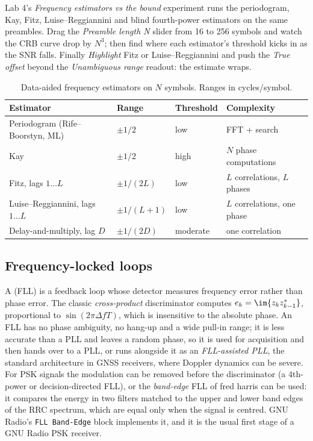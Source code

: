 \begin{tryit}
Lab 4's \emph{Frequency estimators vs the bound} experiment runs the periodogram, Kay, Fitz,
Luise--Reggiannini and blind fourth-power estimators on the same preambles. Drag the \emph{Preamble
length N} slider from 16 to 256 symbols and watch the CRB curve drop by $N^3$; then find where each
estimator's threshold kicks in as the SNR falls. Finally \emph{Highlight} Fitz or Luise--Reggiannini
and push the \emph{True offset} beyond the \emph{Unambiguous range} readout: the estimate wraps.
\end{tryit}

\begin{table}[!htb]\centering\small
\caption{Data-aided frequency estimators on $N$ symbols. Ranges in cycles/symbol.}
\label{tab:ch10:freqest}
\begin{tabular}{llll}
\toprule
Estimator & Range & Threshold & Complexity \\
\midrule
Periodogram (Rife--Boorstyn, ML) & $\pm1/2$ & low & FFT + search \\
Kay & $\pm1/2$ & high & $N$ phase computations \\
Fitz, lags $1\dots L$ & $\pm1/(2L)$ & low & $L$ correlations, $L$ phases \\
Luise--Reggiannini, lags $1\dots L$ & $\pm1/(L+1)$ & low & $L$ correlations, one phase \\
Delay-and-multiply, lag $D$ & $\pm1/(2D)$ & moderate & one correlation \\
\bottomrule
\end{tabular}
\end{table}

\subsection{Frequency-locked loops}

A  (FLL) is a feedback loop whose detector measures frequency error
rather than phase error. The classic \emph{cross-product} discriminator computes
$e_k=\im\{z_kz_{k-1}^*\}$, proportional to $\sin(2\pi\Delta f T)$, which is insensitive to the absolute
phase. An FLL has no phase ambiguity, no hang-up and a wide pull-in range; it is less accurate than a
PLL and leaves a random phase, so it is used for acquisition and then hands over to a PLL, or runs
alongside it as an \emph{FLL-assisted PLL}, the standard architecture in GNSS receivers, where
Doppler dynamics can be severe. For PSK signals the modulation can be removed before the
discriminator (a $4$th-power or decision-directed FLL), or the \emph{band-edge} FLL of fred harris
can be used: it compares the energy in two filters matched to the upper and lower band edges of the
RRC spectrum, which are equal only when the signal is centred. GNU Radio's \texttt{FLL Band-Edge}
block implements it, and it is the usual first stage of a GNU Radio PSK receiver.

